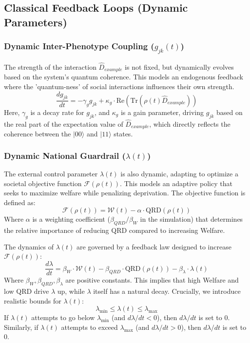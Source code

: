 \documentclass[9pt]{article}
\begin{document}
\subsection{Classical Feedback Loops (Dynamic Parameters)}

\subsubsection{Dynamic Inter-Phenotype Coupling \texorpdfstring{($g_{jk}(t)$)}{(gjk(t))}}
The strength of the interaction $\hat{D}_{example}$ is not fixed, but dynamically evolves based on the system's quantum coherence. This models an endogenous feedback where the 'quantum-ness' of social interactions influences their own strength.
$$ \frac{dg_{jk}}{dt} = -\gamma_g g_{jk} + \kappa_g \cdot \text{Re}(\text{Tr}(\rho(t) \hat{D}_{example})) $$
Here, $\gamma_g$ is a decay rate for $g_{jk}$, and $\kappa_g$ is a gain parameter, driving $g_{jk}$ based on the real part of the expectation value of $\hat{D}_{example}$, which directly reflects the coherence between the $|00\rangle$ and $|11\rangle$ states.

\subsubsection{Dynamic National Guardrail \texorpdfstring{($\lambda(t)$)}{(lambda(t))}}
The external control parameter $\lambda(t)$ is also dynamic, adapting to optimize a societal objective function $\mathcal{F}(\rho(t))$. This models an adaptive policy that seeks to maximize welfare while penalizing deprivation.
The objective function is defined as:
$$ \mathcal{F}(\rho(t)) = \mathcal{W}(t) - \alpha \cdot \text{QRD}(\rho(t)) $$
Where $\alpha$ is a weighting coefficient ($\beta_{QRD}/\beta_W$ in the simulation) that determines the relative importance of reducing QRD compared to increasing Welfare.

The dynamics of $\lambda(t)$ are governed by a feedback law designed to increase $\mathcal{F}(\rho(t))$:
$$ \frac{d\lambda}{dt} = \beta_W \cdot \mathcal{W}(t) - \beta_{QRD} \cdot \text{QRD}(\rho(t)) - \beta_\lambda \cdot \lambda(t) $$
Where $\beta_W, \beta_{QRD}, \beta_\lambda$ are positive constants. This implies that high Welfare and low QRD drive $\lambda$ up, while $\lambda$ itself has a natural decay. Crucially, we introduce realistic bounds for $\lambda(t)$:
$$ \lambda_{\text{min}} \le \lambda(t) \le \lambda_{\text{max}} $$
If $\lambda(t)$ attempts to go below $\lambda_{\text{min}}$ (and $d\lambda/dt < 0$), then $d\lambda/dt$ is set to 0. Similarly, if $\lambda(t)$ attempts to exceed $\lambda_{\text{max}}$ (and $d\lambda/dt > 0$), then $d\lambda/dt$ is set to 0.
\end{document}
